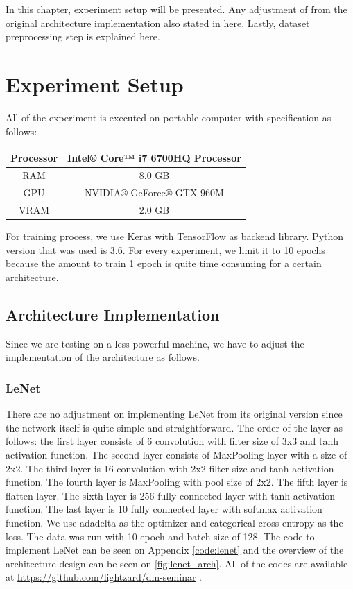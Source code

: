 In this chapter, experiment setup will be presented. Any adjustment of from the original architecture implementation also stated in here. Lastly, dataset preprocessing step is explained here. 

\section{Experiment Setup}
All of the experiment is executed on portable computer with specification as follows:
\begin{center}
	\begin{tabular}{| c| c| }
		\hline
		Processor & Intel® Core™ i7 6700HQ Processor\\ 
		\hline
		RAM & 8.0 GB \\  
		\hline
		GPU & NVIDIA® GeForce® GTX 960M \\
		\hline
		VRAM & 2.0 GB     \\
		\hline
	\end{tabular}
\end{center}

For training process, we use Keras with TensorFlow as backend library. Python version that was used is 3.6. For every experiment, we limit it to 10 epochs because the amount to train 1 epoch is quite time consuming for a certain architecture.

\subsection{Architecture Implementation}
Since we are testing on a less powerful machine, we have to adjust the implementation of the architecture as follows.
\subsubsection{LeNet}
There are no adjustment on implementing LeNet from its original version \cite{lecun1998gradient} since the network itself is quite simple and straightforward. The order of the layer as follows: the first layer consists of 6 convolution with filter size of 3x3 and tanh activation function. The second layer consists of MaxPooling layer with a size of 2x2. The third layer is 16 convolution with 2x2 filter size and tanh activation function. The fourth layer is MaxPooling with pool size of 2x2. The fifth layer is flatten layer. The sixth layer is 256 fully-connected layer with tanh activation function. The last layer is 10 fully connected layer with softmax activation function. We use adadelta as the optimizer and categorical cross entropy as the loss. The data was run with 10 epoch and batch size of 128. The code to implement LeNet can be seen on Appendix \ref{code:lenet} and the overview of the architecture design can be seen on \ref{fig:lenet_arch}. All of the codes are available at \href{https://github.com/lightzard/dm-seminar}{https://github.com/lightzard/dm-seminar} .

